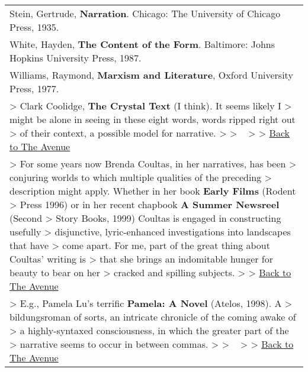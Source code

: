 \begin{longtable}[]{@{}l@{}}
\begin{minipage}[t]{0.97\columnwidth}
Stein, Gertrude, \textbf{Narration}. Chicago: The University of Chicago
Press, 1935.\strut
\end{minipage}\tabularnewline
\begin{minipage}[t]{0.97\columnwidth}\raggedright
White, Hayden, \textbf{The Content of the Form}. Baltimore: Johns
Hopkins University Press, 1987.\strut
\end{minipage}\tabularnewline
\begin{minipage}[t]{0.97\columnwidth}\raggedright
Williams, Raymond, \textbf{Marxism and Literature}, Oxford University
Press, 1977.\strut
\end{minipage}\tabularnewline
\begin{minipage}[t]{0.97\columnwidth}\raggedright
\textgreater{} Clark Coolidge, \textbf{The Crystal Text} (I
think)\emph{.} It seems likely I \textgreater{} might be alone in seeing
in these eight words, words ripped right out \textgreater{} of their
context, a possible model for narrative. \textgreater{} \textgreater{} ~
\textgreater{} \textgreater{} \href{hunt.html}{Back to The Avenue}\strut
\end{minipage}\tabularnewline
\begin{minipage}[t]{0.97\columnwidth}\raggedright
\textgreater{} For some years now Brenda Coultas, in her narratives, has
been \textgreater{} conjuring worlds to which multiple qualities of the
preceding \textgreater{} description might apply. Whether in her book
\textbf{Early Films} (Rodent \textgreater{} Press 1996) or in her recent
chapbook \textbf{A Summer Newsreel} (Second \textgreater{} Story Books,
1999) Coultas is engaged in constructing usefully \textgreater{}
disjunctive, lyric-enhanced investigations into landscapes that have
\textgreater{} come apart. For me, part of the great thing about
Coultas' writing is \textgreater{} that she brings an indomitable hunger
for beauty to bear on her \textgreater{} cracked and spilling subjects.
\textgreater{} \textgreater{} \href{hunt.html}{Back to The Avenue}\strut
\end{minipage}\tabularnewline
\begin{minipage}[t]{0.97\columnwidth}\raggedright
\textgreater{} E.g., Pamela Lu's terrific \textbf{Pamela: A Novel}
(Atelos, 1998). A \textgreater{} bildungsroman of sorts, an intricate
chronicle of the coming awake of \textgreater{} a highly-syntaxed
consciousness, in which the greater part of the \textgreater{} narrative
seems to occur in between commas. \textgreater{} \textgreater{} ~
\textgreater{} \textgreater{} \href{hunt.html}{Back to The Avenue}\strut

\end{minipage}
\end{longtable}
